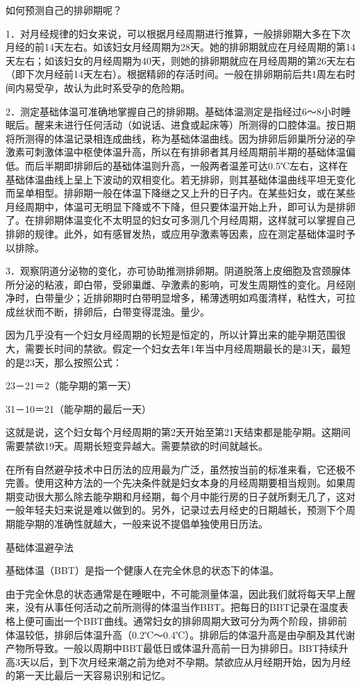 \documentclass[12pt,UTF8,openany]{ctexbook}
\begin{document}
如何预测自己的排卵期呢？

1．对月经规律的妇女来说，可以根据月经周期进行推算，一般排卵期大多在下次月经的前14天左右。如该妇女月经周期为28天。她的排卵期就应在月经周期的第14天左右；如该妇女的月经周期为40天，则她的排卵期就应在月经周期的第26天左右（即下次月经前14天左右）。根据精卵的存活时间。一般在排卵期前后共1周左右时间内易受孕，故认为此时系受孕的危险期。

2．测定基础体温可准确地掌握自己的排卵期。基础体温测定是指经过6～8小时睡眠后。醒来未进行任何活动（如说话、进食或起床等）所测得的口腔体温。按日期将所测得的体温记录相连成曲线，称为基础体温曲线。因为排卵后卵巢所分泌的孕激素可刺激体温中枢使体温升高，所以在有排卵者其月经周期前半期的基础体温偏低。而后半期即排卵后的基础体温则升高，一般两者温差可达0.5℃左右，这样在基础体温曲线上呈上下波动的双相变化。若无排卵，则其基础体温曲线平坦无变化而呈单相型。排卵期一般在体温下降继之又上升的日子内。在某些妇女，或在某些月经周期中，体温可无明显下降或不下降，但只要体温开始上升，即可认为是排卵了。在排卵期体温变化不太明显的妇女可多测几个月经周期，这样就可以掌握自己排卵的规律。此外，如有感冒发热，或应用孕激素等因素，应在测定基础体温时予以排除。

3．观察阴道分泌物的变化，亦可协助推测排卵期。阴道脱落上皮细胞及宫颈腺体所分泌的粘液，即白带，受卵巢雌、孕激素的影响，可发生周期性的变化。月经刚净时，白带量少；近排卵期时白带明显增多，稀薄透明如鸡蛋清样，粘性大，可拉成丝状而不断，排卵后，白带变得混浊。量少。

因为几乎没有一个妇女月经周期的长短是恒定的，所以计算出来的能孕期范围很大，需要长时间的禁欲。假定一个妇女去年1年当中月经周期最长的是31天，最短的是23天，那么按照公式：

23－21＝2（能孕期的第一天）

31－10＝21（能孕期的最后一天）

这就是说，这个妇女每个月经周期的第2天开始至第21天结束都是能孕期。这期间需要禁欲19天。周期长短变异越大。需要禁欲的时间就越长。

在所有自然避孕技术中日历法的应用最为广泛，虽然按当前的标准来看，它还极不完善。使用这种方法的一个先决条件就是妇女本身的月经周期要相当规则。如果周期变动很大那么除去能孕期和月经期，每个月中能行房的日子就所剩无几了，这对一般年轻夫妇来说是难以做到的。另外，记录过去月经史的日期越长，预测下个周期能孕期的准确性就越大，一般来说不提倡单独使用日历法。

基础体温避孕法

基础体温（BBT）是指一个健康人在完全休息的状态下的体温。

由于完全休息的状态通常是在睡眠中，不可能测量体温，因此我们就将每天早上醒来，没有从事任何活动之前所测得的体温当作BBT。把每日的BBT记录在温度表格上便可画出一个BBT曲线。通常妇女的排卵周期大致可分为两个阶段，排卵前体温较低，排卵后体温升高（0.2℃～0.4℃）。排卵后的体温升高是由孕酮及其代谢产物所导致。一般以周期中BBT最低日或体温升高前一日为排卵日。BBT持续升高3天以后，到下次月经来潮之前为绝对不孕期。禁欲应从月经期开始，因为月经的第一天比最后一天容易识别和记忆。
\end{document}
